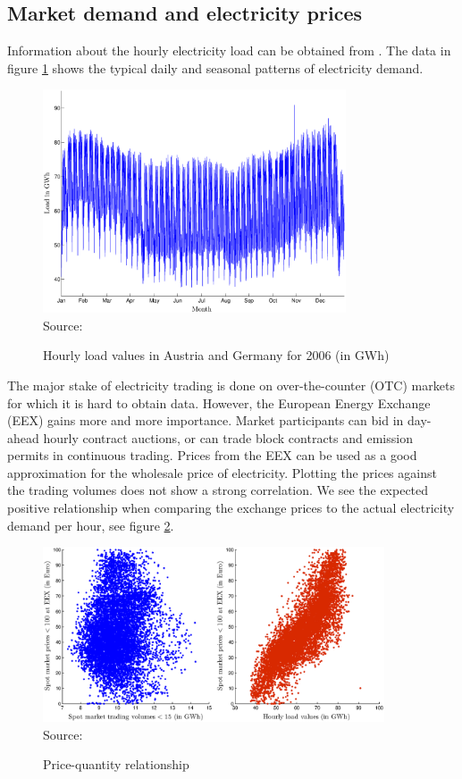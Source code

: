 \clearpage
\subsection{Market demand and electricity prices}
\label{sec:mark-demand-electr}

Information about the hourly electricity load can be obtained from \cite{UCTE2006}. The data in figure \ref{fig:load} shows the typical daily and seasonal patterns of electricity demand.

\begin{figure}[htb]
  \centering
\caption{Hourly load values in Austria and Germany for 2006 (in GWh)}
\includegraphics[width=0.8\textwidth]{loadvalues}
  \label{fig:load}
\\
 \scriptsize Source: \cite{UCTE2006}
\end{figure}


The major stake of electricity trading is done on over-the-counter (OTC) markets for which it is hard to obtain data. However, the European Energy Exchange (EEX) gains more and more importance. Market participants can bid in day-ahead hourly contract auctions, or can trade block contracts and emission permits in continuous trading. Prices from the EEX can be used as a good approximation for the wholesale price of electricity. Plotting the prices against the trading volumes does not show a strong correlation. We see the expected positive relationship when comparing the exchange prices to the actual electricity demand per hour, see figure \ref{fig:pricequant}.

\begin{figure}[htb]
  \centering
\caption{Price-quantity relationship}
  \includegraphics[width=0.9\textwidth]{pricequant}
  \label{fig:pricequant}
\\
 \scriptsize Source: \cite{EEX2006, UCTE2006}
\end{figure}

